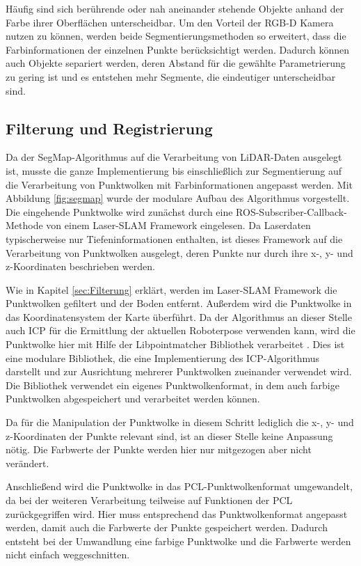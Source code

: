 Häufig sind sich berührende oder nah aneinander stehende Objekte anhand  der Farbe ihrer Oberflächen unterscheidbar. Um den Vorteil der RGB-D Kamera nutzen zu können, werden beide Segmentierungsmethoden so erweitert, dass die Farbinformationen der einzelnen Punkte berücksichtigt werden. Dadurch können  auch Objekte separiert werden, deren Abstand für die gewählte Parametrierung zu gering ist und es entstehen mehr Segmente, die eindeutiger unterscheidbar sind.  

\subsection[Filterung und Registrierung (Kopp)]{Filterung und Registrierung}

Da der SegMap-Algorithmus auf die Verarbeitung von LiDAR-Daten ausgelegt ist, musste die ganze Implementierung bis einschließlich zur Segmentierung auf die Verarbeitung von Punktwolken mit Farbinformationen angepasst werden. Mit Abbildung \ref{fig:segmap} wurde der modulare Aufbau des Algorithmus vorgestellt. Die eingehende Punktwolke wird zunächst durch eine ROS-Subscriber-Callback-Methode von einem Laser-SLAM Framework eingelesen. Da Laserdaten typischerweise nur Tiefeninformationen enthalten, ist dieses Framework auf die Verarbeitung von Punktwolken ausgelegt, deren Punkte nur durch ihre x-, y- und z-Koordinaten beschrieben werden. 

Wie in Kapitel \ref{sec:Filterung} erklärt, werden im Laser-SLAM Framework die Punktwolken gefiltert und der Boden entfernt. Außerdem wird die Punktwolke in das Koordinatensystem der Karte überführt. Da der Algorithmus an dieser Stelle auch ICP für die Ermittlung der aktuellen Roboterpose verwenden kann, wird die Punktwolke hier mit Hilfe der Libpointmatcher Bibliothek verarbeitet \cite{Pomerleau2013}. Dies ist eine modulare Bibliothek, die eine Implementierung des ICP-Algorithmus darstellt und zur Ausrichtung mehrerer Punktwolken zueinander verwendet wird. Die Bibliothek verwendet ein eigenes Punktwolkenformat, in dem auch farbige Punktwolken abgespeichert und verarbeitet werden können. 

Da für die Manipulation der Punktwolke in diesem Schritt lediglich die x-,  y- und z-Koordinaten der Punkte relevant sind, ist an dieser Stelle keine Anpassung nötig. Die Farbwerte der Punkte werden hier nur mitgezogen aber nicht verändert. 

Anschließend wird die Punktwolke in das PCL-Punktwolkenformat umgewandelt, da bei der weiteren Verarbeitung teilweise auf Funktionen der PCL zurückgegriffen wird. Hier muss entsprechend das Punktwolkenformat angepasst werden, damit auch die Farbwerte der Punkte gespeichert werden. Dadurch entsteht bei der Umwandlung eine farbige Punktwolke und die Farbwerte werden nicht einfach weggeschnitten.
 

